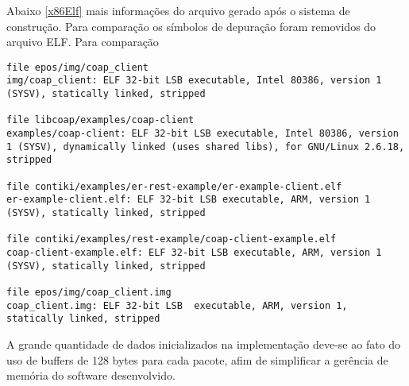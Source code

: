 

Abaixo \ref{x86Elf} mais informa\c{c}\~oes do arquivo gerado ap\'os o sistema de constru\c{c}\~ao. Para compara\c{c}\~ao os s\'imbolos de depura\c{c}\~ao foram removidos do arquivo ELF. Para compara\c{c}\~ao 

\begin{lstlisting}[label={x86Elf},caption=Verificando o tipo de arquivo gerado no Linux utilizando a ferramenta file.]
file epos/img/coap_client
img/coap_client: ELF 32-bit LSB executable, Intel 80386, version 1 (SYSV), statically linked, stripped

file libcoap/examples/coap-client
examples/coap-client: ELF 32-bit LSB executable, Intel 80386, version 1 (SYSV), dynamically linked (uses shared libs), for GNU/Linux 2.6.18, stripped

file contiki/examples/er-rest-example/er-example-client.elf
er-example-client.elf: ELF 32-bit LSB executable, ARM, version 1 (SYSV), statically linked, stripped

file contiki/examples/rest-example/coap-client-example.elf 
coap-client-example.elf: ELF 32-bit LSB executable, ARM, version 1 (SYSV), statically linked, stripped

file epos/img/coap_client.img 
coap_client.img: ELF 32-bit LSB  executable, ARM, version 1, statically linked, stripped
\end{lstlisting}



A grande quantidade de dados inicializados na implementa\c{c}\~ao deve-se ao fato do uso de buffers de 128 bytes para cada pacote, afim de simplificar a ger\^encia de mem\'oria do software desenvolvido. %

